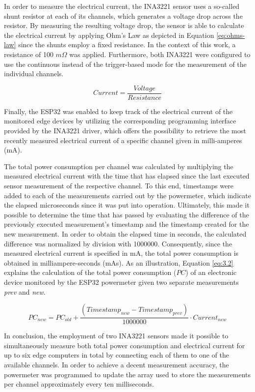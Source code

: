 In order to measure the electrical current, the INA3221 sensor uses a so-called shunt resistor at each of its channels, which generates a voltage drop across the resistor. By measuring the resulting voltage drop, the sensor is able to calculate the electrical current by applying Ohm's Law as depicted in Equation \ref{eq:ohms-law} since the shunts employ a fixed resistance. In the context of this work, a resistance of 100 $m\Omega$ was applied. Furthermore, both INA3221 were configured to use the continuous instead of the trigger-based mode for the measurement of the individual channels.

\begin{equation} \label{eq:ohms-law}
   Current = \frac{Voltage}{Resistance}
\end{equation}

Finally, the ESP32 was enabled to keep track of the electrical current of the monitored edge devices by utilizing the corresponding programming interface provided by the INA3221 driver, which offers the possibility to retrieve the most recently measured electrical current of a specific channel given in milli-amperes (mA).

The total power consumption per channel was calculated by multiplying the measured electrical current with the time that has elapsed since the last executed sensor measurement of the respective channel. To this end, timestamps were added to each of the measurements carried out by the powermeter, which indicate the elapsed microseconds since it was put into operation. Ultimately, this made it possible to determine the time that has passed by evaluating the difference of the previously executed measurement's timestamp and the timestamp created for the new measurement. In order to obtain the elapsed time in seconds, the calculated difference was normalized by division with 1000000. Consequently, since the measured electrical current is specified in mA, the total power consumption is obtained in milliampere-seconds (mAs). As an illustration, Equation \ref{eq:3.2} explains the calculation of the total power consumption ($PC$) of an electronic device monitored by the ESP32 powermeter given two separate measurements \textit{prev} and \textit{new}.

\begin{equation} \label{eq:3.2}
   PC_{new} = PC_{old} + \frac{(Timestamp_{new} - Timestamp_{prev})}{1000000} \cdot Current_{new}
\end{equation}

In conclusion, the employment of two INA3221 sensors made it possible to simultaneously measure both total power consumption and electrical current for up to six edge computers in total by connecting each of them to one of the available channels. In order to achieve a decent measurement accuracy, the powermeter was programmed to update the array used to store the measurements per channel approximately every ten milliseconds.

